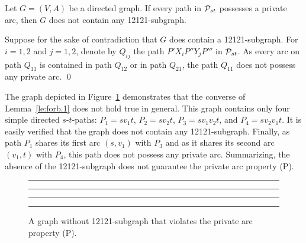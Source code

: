 \begin{lemma}
\label{le:forb.1}
Let $G=(V,A)$ be a directed graph. 
If every path in ${\cal P}_{st}$ possesses a private arc,
then $G$ does not contain any 12121-subgraph.
\end{lemma}
\proof
Suppose for the sake of contradiction that $G$ does contain a 12121-subgraph.
For $i=1,2$ and $j=1,2$, denote by $Q_{ij}$ the path $P'X_iP''Y_jP'''$ in ${\cal P}_{st}$.
As every arc on path $Q_{11}$ is contained in path $Q_{12}$ or in path $Q_{21}$, the path $Q_{11}$
does not possess any private arc.
\qed

\bigskip
The graph depicted in Figure~\ref{fig:bad-example} demonstrates that the 
converse of Lemma~\ref{le:forb.1} does not hold true in general.
This graph contains only four simple directed $s$-$t$-paths: 
$P_1=sv_1t$,
$P_2=sv_2t$,
$P_3=sv_1v_2t$, and
$P_4=sv_2v_1t$.
It is easily verified that the graph does not contain any 12121-subgraph.
Finally, as path $P_1$ shares its first arc $(s,v_1)$ with $P_3$ and as it shares
its second arc $(v_1,t)$ with $P_4$, this path does not possess any private arc.
Summarizing, the absence of the 12121-subgraph does not guarantee the private arc property (P).

\begin{figure}[bth]
\hrule\hrule
\bigskip
\begin{center}
\end{center}
\vspace{-4ex}
\caption{A graph without 12121-subgraph that violates the private arc property (P).}
\label{fig:bad-example}
\bigskip
\hrule\hrule
\end{figure}


